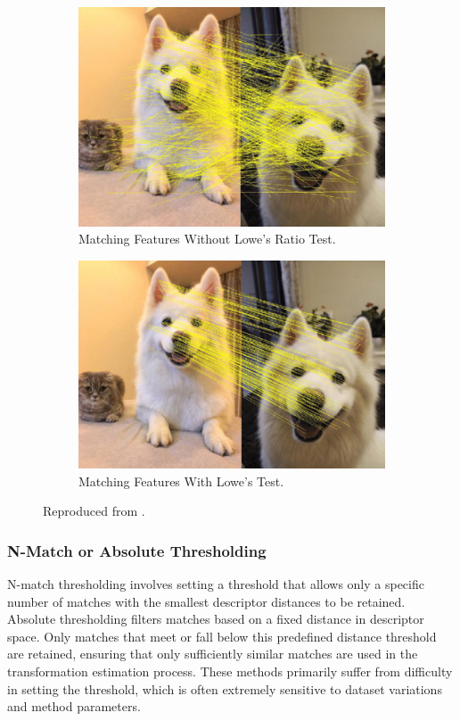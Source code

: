 \begin{figure}[H]
    \centering
    \begin{subfigure}[b]{0.37\textwidth}
        \includegraphics[width=\textwidth]{./Chapter 2/litfigs/lowes1.png}
        \caption{Matching Features Without Lowe's Ratio Test.}
        \label{fig:lowes1}
    \end{subfigure}
    \hfill
    \begin{subfigure}[b]{0.37\textwidth}
        \includegraphics[width=\textwidth]{./Chapter 2/litfigs/lowes2.png}
        \caption{Matching Features With Lowe's Test.}
        \label{fig:lowes2}
    \end{subfigure}
    \caption{Reproduced from \cite{bian2020gms}.}
    \label{fig:lowes}
\end{figure}


\subsubsection{N-Match or Absolute Thresholding}
N-match thresholding involves setting a threshold that allows only a specific number of matches with the smallest descriptor distances to be retained. Absolute thresholding filters matches based on a fixed distance in descriptor space. Only matches that meet or fall below this predefined distance threshold are retained, ensuring that only sufficiently similar matches are used in the transformation estimation process. These methods primarily suffer from difficulty in setting the threshold, which is often extremely sensitive to dataset variations and method parameters.
